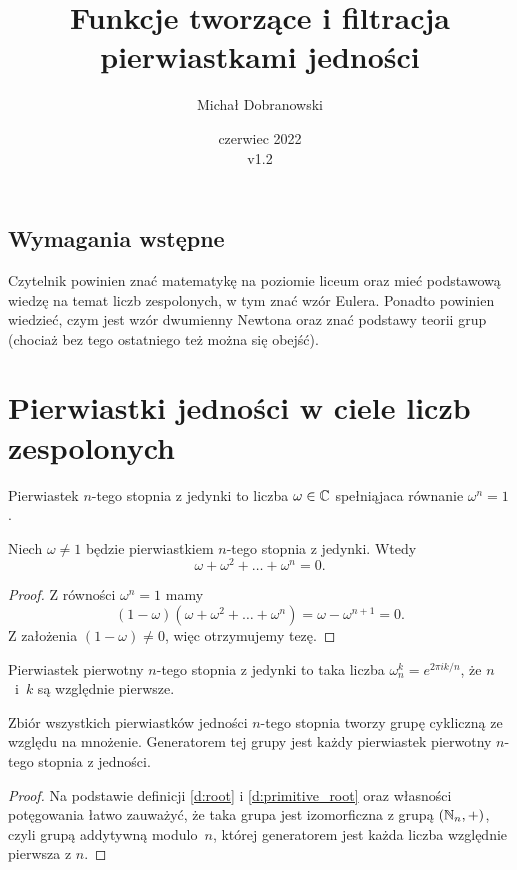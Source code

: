 \documentclass{scrartcl}
\title{Funkcje tworzące i filtracja pierwiastkami jedności}
\author{Michał Dobranowski}
\date{czerwiec 2022 \\ v1.2}
\begin{document}
    \maketitle
    \subsection*{Wymagania wstępne}
    Czytelnik powinien znać matematykę na poziomie liceum oraz mieć podstawową wiedzę na temat liczb zespolonych, w tym znać wzór Eulera. Ponadto powinien wiedzieć, czym jest wzór dwumienny Newtona oraz znać podstawy teorii grup (chociaż bez tego ostatniego też można się obejść).
    \tableofcontents
    \eject

\section{Pierwiastki jedności w ciele liczb zespolonych}
    \begin{definition}
        \label{d:root}
        Pierwiastek $n$-tego stopnia z jedynki to liczba $\omega \in \mathbb C$ spełniąjaca równanie $\omega^n = 1$.
    \end{definition}

    \begin{lemma}
        \label{l:roots_sum}
        Niech $\omega \neq 1$ będzie pierwiastkiem $n$-tego stopnia z jedynki. Wtedy
        $$ \omega + \omega^2 + \ldots + \omega^n = 0. $$
    \end{lemma}
    \begin{proof}
        Z równości $\omega^n = 1$ mamy
        $$ (1 - \omega)(\omega + \omega^2 + \ldots + \omega^n) = \omega - \omega^{n+1} = 0. $$
        Z założenia $(1 - \omega) \neq 0$, więc otrzymujemy tezę.
    \end{proof}

    \begin{definition}
        \label{d:primitive_root}
        Pierwiastek pierwotny $n$-tego stopnia z jedynki to taka liczba $\omega_n^k = e^{2\pi i k / n}$, że $n$~i~$k$ są względnie pierwsze.
    \end{definition}

    \begin{lemma}
        \label{l:roots_group}
        Zbiór wszystkich pierwiastków jedności $n$-tego stopnia tworzy grupę cykliczną ze względu na mnożenie. Generatorem tej grupy jest każdy pierwiastek pierwotny $n$-tego stopnia z jedności.
    \end{lemma}
    \begin{proof}
        Na podstawie definicji \ref{d:root} i \ref{d:primitive_root} oraz własności potęgowania łatwo zauważyć, że taka grupa jest izomorficzna z grupą $(\mathbb N_n, +)$, czyli grupą addytywną modulo~$n$, której generatorem jest każda liczba względnie pierwsza z $n$.
    \end{proof}
\end{document}
